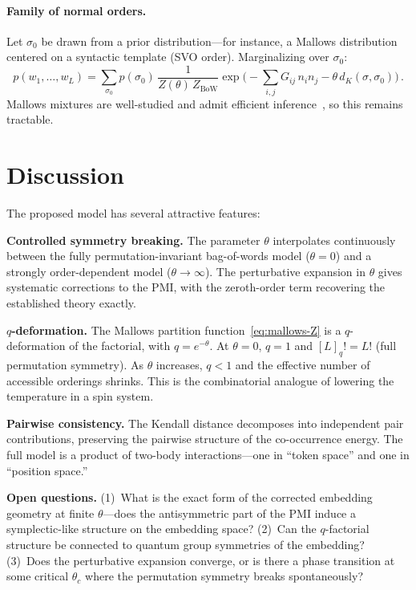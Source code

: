 \documentclass[11pt]{article}
\newcommand{\BoW}{\mathrm{BoW}}
\begin{document}
\paragraph{Family of normal orders.} Let $\sigma_0$ be drawn from a prior distribution---for instance, a Mallows distribution centered on a syntactic template (SVO order). Marginalizing over $\sigma_0$:
\begin{equation}
    p(w_1, \ldots, w_L) = \sum_{\sigma_0} p(\sigma_0)\, \frac{1}{Z(\theta)\, Z_{\BoW}} \exp\!\Big(-\sum_{i,j} G_{ij}\, n_i n_j - \theta\, d_K(\sigma, \sigma_0)\Big)\,.
\end{equation}
Mallows mixtures are well-studied and admit efficient inference~\cite{lu2011}, so this remains tractable.

\section{Discussion}

The proposed model has several attractive features:

\textbf{Controlled symmetry breaking.} The parameter $\theta$ interpolates continuously between the fully permutation-invariant bag-of-words model ($\theta = 0$) and a strongly order-dependent model ($\theta \to \infty$). The perturbative expansion in $\theta$ gives systematic corrections to the PMI, with the zeroth-order term recovering the established theory exactly.

\textbf{$q$-deformation.} The Mallows partition function~\eqref{eq:mallows-Z} is a $q$-deformation of the factorial, with $q = e^{-\theta}$. At $\theta = 0$, $q = 1$ and $[L]_q! = L!$ (full permutation symmetry). As $\theta$ increases, $q < 1$ and the effective number of accessible orderings shrinks. This is the combinatorial analogue of lowering the temperature in a spin system.

\textbf{Pairwise consistency.} The Kendall distance decomposes into independent pair contributions, preserving the pairwise structure of the co-occurrence energy. The full model is a product of two-body interactions---one in ``token space'' and one in ``position space.''

\textbf{Open questions.} (1)~What is the exact form of the corrected embedding geometry at finite $\theta$---does the antisymmetric part of the PMI induce a symplectic-like structure on the embedding space? (2)~Can the $q$-factorial structure be connected to quantum group symmetries of the embedding? (3)~Does the perturbative expansion converge, or is there a phase transition at some critical $\theta_c$ where the permutation symmetry breaks spontaneously?
\end{document}
